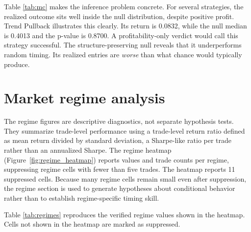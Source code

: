 \documentclass[preprint,12pt]{elsarticle}
\theoremstyle{definition}
\begin{document}
Table \ref{tab:mc} makes the inference problem concrete. For several strategies, the realized outcome sits well inside the null distribution, despite positive profit. Trend Pullback illustrates this clearly. Its return is 0.0832, while the null median is 0.4013 and the p-value is 0.8700. A profitability-only verdict would call this strategy successful. The structure-preserving null reveals that it underperforms random timing. Its realized entries are \emph{worse} than what chance would typically produce.

\section{Market regime analysis}

The regime figures are descriptive diagnostics, not separate hypothesis tests. They summarize trade-level performance using a trade-level return ratio defined as mean return divided by standard deviation, a Sharpe-like ratio per trade rather than an annualized Sharpe. The regime heatmap (Figure~\ref{fig:regime_heatmap}) reports values and trade counts per regime, suppressing regime cells with fewer than five trades. The heatmap reports 11 suppressed cells. Because many regime cells remain small even after suppression, the regime section is used to generate hypotheses about conditional behavior rather than to establish regime-specific timing skill.

Table \ref{tab:regimes} reproduces the verified regime values shown in the heatmap. Cells not shown in the heatmap are marked as suppressed.
\end{document}
